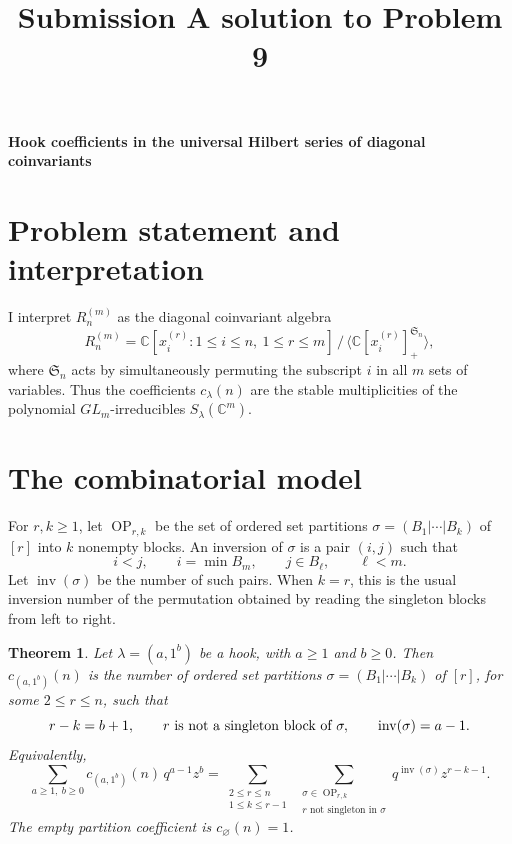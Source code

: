 \documentclass[12pt]{article}
\newtheorem{theorem}{Theorem}
\newcommand{\OP}{\operatorname{OP}}
\newcommand{\inv}{\operatorname{inv}}
\begin{document}
\title{Submission A solution to Problem 9}
\date{}
\maketitle

\begin{center}
{\bf Hook coefficients in the universal Hilbert series of diagonal coinvariants}
\end{center}

\section*{Problem statement and interpretation}

I interpret \(R_n^{(m)}\) as the diagonal coinvariant algebra
\[
 R_n^{(m)}=\mathbb C[x_i^{(r)}:1\le i\le n,\ 1\le r\le m]\,
/\,\langle \mathbb C[x_i^{(r)}]^{\mathfrak S_n}_{+}\rangle,
\]
where \(\mathfrak S_n\) acts by simultaneously permuting the subscript \(i\) in all
\(m\) sets of variables.  Thus the coefficients \(c_\lambda(n)\) are the stable
multiplicities of the polynomial \(GL_m\)-irreducibles \(S_\lambda(\mathbb C^m)\).

\section*{The combinatorial model}

For \(r,k\ge 1\), let \(\OP_{r,k}\) be the set of ordered set partitions
\(\sigma=(B_1|\cdots|B_k)\) of \([r]\) into \(k\) nonempty blocks.  An inversion of
\(\sigma\) is a pair \((i,j)\) such that
\[
        i<j,\qquad i=\min B_m,\qquad j\in B_\ell,\qquad \ell<m .
\]
Let \(\inv(\sigma)\) be the number of such pairs.  When \(k=r\), this is the
usual inversion number of the permutation obtained by reading the singleton
blocks from left to right.

\begin{theorem}
Let \(\lambda=(a,1^b)\) be a hook, with \(a\ge 1\) and \(b\ge 0\).  Then
\(c_{(a,1^b)}(n)\) is the number of ordered set partitions
\(\sigma=(B_1|\cdots|B_k)\) of \([r]\), for some \(2\le r\le n\), such that
\[
        r-k=b+1,\qquad r\hbox{ is not a singleton block of }\sigma,\qquad
        \inv(\sigma)=a-1 .
\]
Equivalently,
\[
\sum_{a\ge1,\ b\ge0} c_{(a,1^b)}(n)\,q^{a-1}z^b
=
\sum_{\substack{2\le r\le n\\1\le k\le r-1}}
\ \sum_{\substack{\sigma\in \OP_{r,k}\\
                  r\text{ not singleton in }\sigma}}
        q^{\inv(\sigma)}z^{r-k-1}.
\]
The empty partition coefficient is \(c_{\varnothing}(n)=1\).
\end{theorem}
\end{document}
